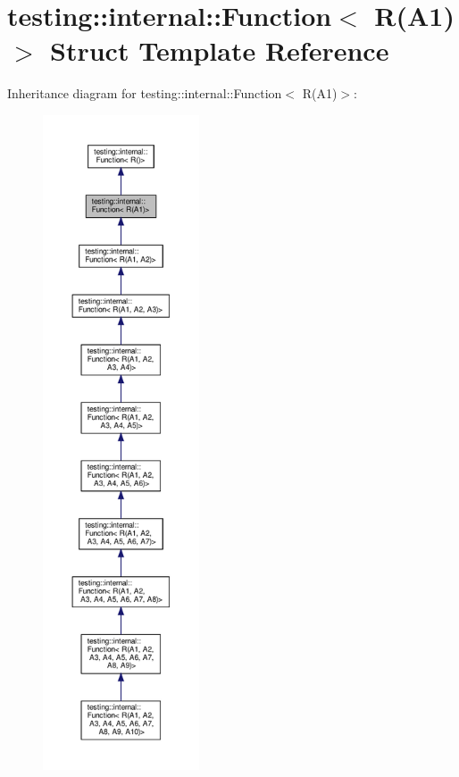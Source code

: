\hypertarget{structtesting_1_1internal_1_1_function_3_01_r_07_a1_08_4}{}\section{testing\+:\+:internal\+:\+:Function$<$ R(A1)$>$ Struct Template Reference}
\label{structtesting_1_1internal_1_1_function_3_01_r_07_a1_08_4}


Inheritance diagram for testing\+:\+:internal\+:\+:Function$<$ R(A1)$>$\+:
\nopagebreak
\begin{figure}[H]
\begin{center}
\leavevmode
\includegraphics[height=550pt]{structtesting_1_1internal_1_1_function_3_01_r_07_a1_08_4__inherit__graph}
\end{center}
\end{figure}


